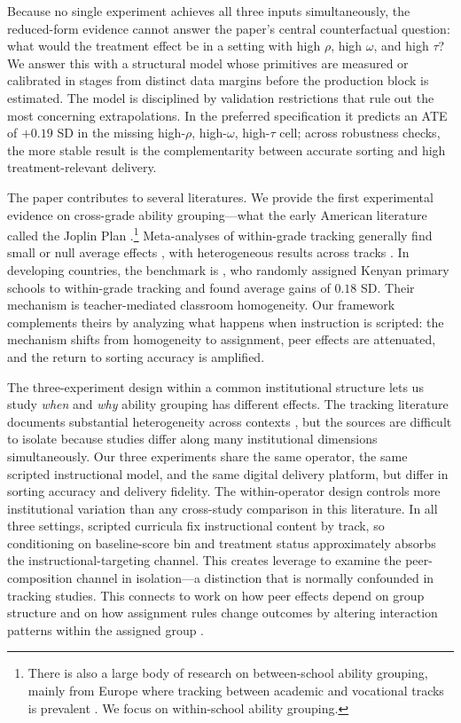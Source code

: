 \documentclass[11pt]{article}
\begin{document}
Because no single experiment achieves all three inputs simultaneously, the reduced-form evidence cannot answer the paper's central counterfactual question: what would the treatment effect be in a setting with high $\rho$, high $\omega$, and high $\tau$? We answer this with a structural model whose primitives are measured or calibrated in stages from distinct data margins before the production block is estimated. The model is disciplined by validation restrictions that rule out the most concerning extrapolations. In the preferred specification it predicts an ATE of $+0.19$ SD in the missing high-$\rho$, high-$\omega$, high-$\tau$ cell; across robustness checks, the more stable result is the complementarity between accurate sorting and high treatment-relevant delivery.

The paper contributes to several literatures. We provide the first experimental evidence on cross-grade ability grouping---what the early American literature called the Joplin Plan \citep{floyd:1954}.\footnote{There is also a large body of research on between-school ability grouping, mainly from Europe where tracking between academic and vocational tracks is prevalent \citep{fu2018ability,lavrijsen2015new}. We focus on within-school ability grouping.} Meta-analyses of within-grade tracking generally find small or null average effects \citep{slavin:1987,slavin1990achievement,kulik1987effects,terrin2022effect}, with heterogeneous results across tracks \citep{burke2013classroom,hoxby2005taking,antecol2016peer,garlick,de2022college}. In developing countries, the benchmark is \citet{duflo2011peer}, who randomly assigned Kenyan primary schools to within-grade tracking and found average gains of $0.18$ SD. Their mechanism is teacher-mediated classroom homogeneity. Our framework complements theirs by analyzing what happens when instruction is scripted: the mechanism shifts from homogeneity to assignment, peer effects are attenuated, and the return to sorting accuracy is amplified.

The three-experiment design within a common institutional structure lets us study \emph{when} and \emph{why} ability grouping has different effects. The tracking literature documents substantial heterogeneity across contexts \citep{betts:2011,card2016can,vardardottir2013peer}, but the sources are difficult to isolate because studies differ along many institutional dimensions simultaneously. Our three experiments share the same operator, the same scripted instructional model, and the same digital delivery platform, but differ in sorting accuracy and delivery fidelity. The within-operator design controls more institutional variation than any cross-study comparison in this literature. In all three settings, scripted curricula fix instructional content by track, so conditioning on baseline-score bin and treatment status approximately absorbs the instructional-targeting channel. This creates leverage to examine the peer-composition channel in isolation---a distinction that is normally confounded in tracking studies. This connects to work on how peer effects depend on group structure \citep{hoxby2005taking,rjosk2022dispersion,vigdor2007peer} and on how assignment rules change outcomes by altering interaction patterns within the assigned group \citep{carrellsacerdotewest2013,garlick}.
\end{document}
